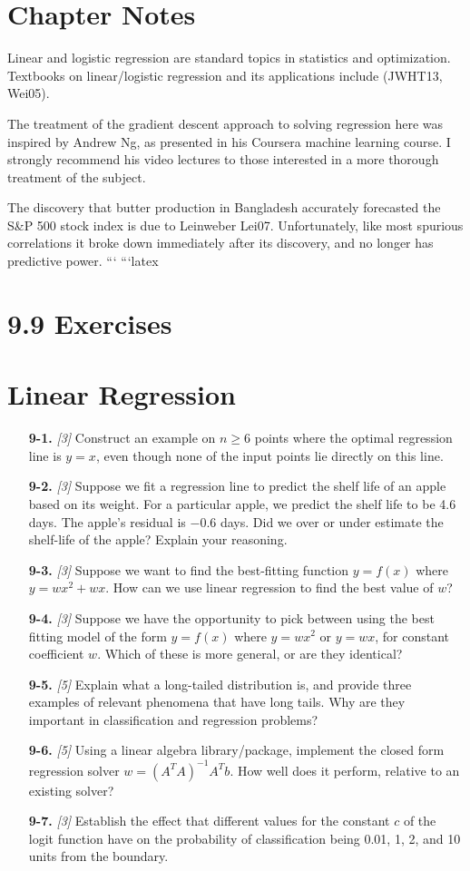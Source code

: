 \documentclass[10pt]{article}
\begin{document}
\section{Chapter Notes}
Linear and logistic regression are standard topics in statistics and optimization. Textbooks on linear/logistic regression and its applications include (JWHT13, Wei05).

The treatment of the gradient descent approach to solving regression here was inspired by Andrew Ng, as presented in his Coursera machine learning course. I strongly recommend his video lectures to those interested in a more thorough treatment of the subject.

The discovery that butter production in Bangladesh accurately forecasted the S\&P 500 stock index is due to Leinweber Lei07. Unfortunately, like most spurious correlations it broke down immediately after its discovery, and no longer has predictive power.
```
```latex
\section*{9.9 Exercises}
\section*{Linear Regression}
\begin{enumerate}
    \item [{\bf 9-1.}] \emph{[3]} Construct an example on $n \geq 6$ points where the optimal regression line is $y = x$, even though none of the input points lie directly on this line.
    \item [{\bf 9-2.}] \emph{[3]} Suppose we fit a regression line to predict the shelf life of an apple based on its weight. For a particular apple, we predict the shelf life to be 4.6 days. The apple's residual is $-0.6$ days. Did we over or under estimate the shelf-life of the apple? Explain your reasoning.
    \item [{\bf 9-3.}] \emph{[3]} Suppose we want to find the best-fitting function $y = f(x)$ where $y = wx^2 + wx$. How can we use linear regression to find the best value of $w$?
    \item [{\bf 9-4.}] \emph{[3]} Suppose we have the opportunity to pick between using the best fitting model of the form $y = f(x)$ where $y = wx^2$ or $y = wx$, for constant coefficient $w$. Which of these is more general, or are they identical?
    \item [{\bf 9-5.}] \emph{[5]} Explain what a long-tailed distribution is, and provide three examples of relevant phenomena that have long tails. Why are they important in classification and regression problems?
    \item [{\bf 9-6.}] \emph{[5]} Using a linear algebra library/package, implement the closed form regression solver $w = (A^T A)^{-1} A^T b$. How well does it perform, relative to an existing solver?
    \item [{\bf 9-7.}] \emph{[3]} Establish the effect that different values for the constant $c$ of the logit function have on the probability of classification being 0.01, 1, 2, and 10 units from the boundary.
\end{enumerate}
\end{document}
